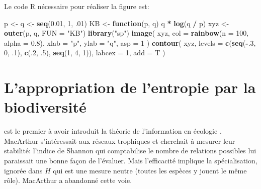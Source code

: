 \documentclass[
  11pt,
  american,
  a4paper,
  extrafontsizes,onecolumn,openright
  ]{memoir}
\newenvironment{Shaded}{\begin{snugshade}}{\end{snugshade}}
\newcommand{\AttributeTok}[1]{\textcolor[rgb]{0.13,0.29,0.53}{#1}}
\newcommand{\ControlFlowTok}[1]{\textcolor[rgb]{0.13,0.29,0.53}{\textbf{#1}}}
\newcommand{\DecValTok}[1]{\textcolor[rgb]{0.00,0.00,0.81}{#1}}
\newcommand{\FloatTok}[1]{\textcolor[rgb]{0.00,0.00,0.81}{#1}}
\newcommand{\FunctionTok}[1]{\textcolor[rgb]{0.13,0.29,0.53}{\textbf{#1}}}
\newcommand{\NormalTok}[1]{#1}
\newcommand{\OtherTok}[1]{\textcolor[rgb]{0.56,0.35,0.01}{#1}}
\newcommand{\SpecialCharTok}[1]{\textcolor[rgb]{0.81,0.36,0.00}{\textbf{#1}}}
\newcommand{\StringTok}[1]{\textcolor[rgb]{0.31,0.60,0.02}{#1}}
\begin{document}
Le code R nécessaire pour réaliser la figure est:

\scriptsize

\begin{Shaded}
\begin{Highlighting}[]
\NormalTok{p }\OtherTok{\textless{}{-}}\NormalTok{ q }\OtherTok{\textless{}{-}} \FunctionTok{seq}\NormalTok{(}\FloatTok{0.01}\NormalTok{, }\DecValTok{1}\NormalTok{, .}\DecValTok{01}\NormalTok{)}
\NormalTok{KB }\OtherTok{\textless{}{-}} \ControlFlowTok{function}\NormalTok{(p, q) q }\SpecialCharTok{*} \FunctionTok{log}\NormalTok{(q }\SpecialCharTok{/}\NormalTok{ p)}
\NormalTok{xyz }\OtherTok{\textless{}{-}} \FunctionTok{outer}\NormalTok{(p, q, }\AttributeTok{FUN =} \StringTok{"KB"}\NormalTok{)}
\FunctionTok{library}\NormalTok{(}\StringTok{"sp"}\NormalTok{)}
\FunctionTok{image}\NormalTok{(}
\NormalTok{  xyz, }
  \AttributeTok{col =} \FunctionTok{rainbow}\NormalTok{(}\AttributeTok{n =} \DecValTok{100}\NormalTok{, }\AttributeTok{alpha =} \FloatTok{0.8}\NormalTok{), }
  \AttributeTok{xlab =} \StringTok{"p"}\NormalTok{, }
  \AttributeTok{ylab =} \StringTok{"q"}\NormalTok{, }
  \AttributeTok{asp =} \DecValTok{1}
\NormalTok{)}
\FunctionTok{contour}\NormalTok{(}
\NormalTok{  xyz, }
  \AttributeTok{levels =} \FunctionTok{c}\NormalTok{(}\FunctionTok{seq}\NormalTok{(}\SpecialCharTok{{-}}\NormalTok{.}\DecValTok{3}\NormalTok{, }\DecValTok{0}\NormalTok{, .}\DecValTok{1}\NormalTok{), }\FunctionTok{c}\NormalTok{(.}\DecValTok{2}\NormalTok{, .}\DecValTok{5}\NormalTok{), }\FunctionTok{seq}\NormalTok{(}\DecValTok{1}\NormalTok{, }\DecValTok{4}\NormalTok{, }\DecValTok{1}\NormalTok{)), }
  \AttributeTok{labcex =} \DecValTok{1}\NormalTok{, }
  \AttributeTok{add =}\NormalTok{ T}
\NormalTok{)}
\end{Highlighting}
\end{Shaded}

\normalsize

\section{L'appropriation de l'entropie par la biodiversité}\label{lappropriation-de-lentropie-par-la-biodiversituxe9}

\textcite{MacArthur1955} est le premier à avoir introduit la théorie de l'information en écologie \autocite{Ulanowicz2001}.
MacArthur s'intéressait aux réseaux trophiques et cherchait à mesurer leur stabilité: l'indice de Shannon qui comptabilise le nombre de relations possibles lui paraissait une bonne façon de l'évaluer.
Mais l'efficacité implique la spécialisation, ignorée dans \(H\) qui est une mesure neutre (toutes les espèces y jouent le même rôle).
MacArthur a abandonné cette voie.
\end{document}
